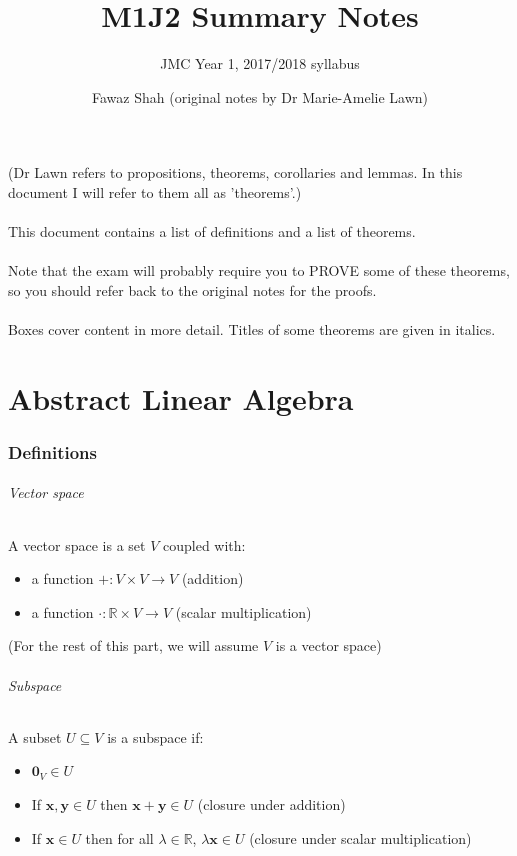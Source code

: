 \documentclass{scrartcl}
\title{M1J2 Summary Notes}
\subtitle{JMC Year 1, 2017/2018 syllabus}
\date{}
\author{Fawaz Shah (original notes by Dr Marie-Amelie Lawn)}
\newcommand{\R}{\mathbb{R}}
\renewcommand{\vec}[1]{\mathbf{#1}}
\begin{document}
\large
\maketitle
\noindent (Dr Lawn refers to propositions, theorems, corollaries and lemmas. In this document I will refer to them all as 'theorems'.)
\\\\
This document contains a list of definitions and a list of theorems.
\\\\
Note that the exam will probably require you to PROVE some of these theorems, so you should refer back to the original notes for the proofs.
\\\\
Boxes cover content in more detail. Titles of some theorems are given in italics.
\tableofcontents
\newpage
\part{Abstract Linear Algebra}

\section{Definitions}
\paragraph{Vector space}
A vector space is a set $ V $ coupled with:
\begin{itemize}
\item a function $ + : V \times V \to V $ (addition)
\item a function $ \cdot : \R \times V \to V $ (scalar multiplication)
\end{itemize}
(For the rest of this part, we will assume $ V $ is a vector space)
\paragraph{Subspace}
A subset $ U \subseteq V $ is a subspace if:
\begin{itemize}
\item $ \vec{0}_{V} \in U $
\item If $ \vec{x}, \vec{y} \in U $ then $ \vec{x + y} \in U $ (closure under addition)
\item If $ \vec{x} \in U $ then for all $ \lambda \in \R $, $ \lambda\vec{x} \in U $ (closure under scalar multiplication)
\end{itemize}
\end{document}
